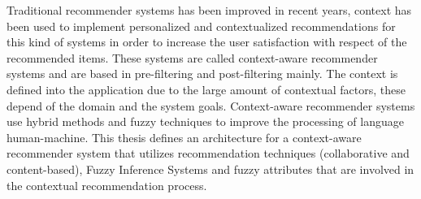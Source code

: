Traditional recommender systems has been improved in recent years,
context has been used to implement personalized and contextualized
recommendations for this kind of systems in order to increase the user
satisfaction with respect of the recommended items. These systems are
called context-aware recommender systems and are based in pre-filtering and post-filtering mainly. The context is defined  into the
application due to the large amount of contextual factors, these
depend of the domain and the system goals. Context-aware recommender
systems use hybrid methods and fuzzy techniques to improve the
processing of language human-machine. This thesis defines  an
architecture  for a context-aware recommender system that utilizes
recommendation techniques (collaborative and content-based), Fuzzy
Inference Systems and fuzzy attributes that are involved in the
contextual recommendation process.










